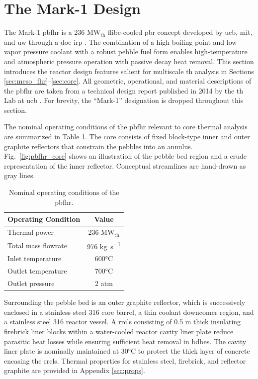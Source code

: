 \section{The Mark-1 Design}
\label{sec:mark1}

The Mark-1 \gls{pbfhr} is a 236 MW$_\text{th}$ \gls{flibe}-cooled \gls{pbr} concept developed by \gls{ucb}, \gls{mit}, and \gls{uw} through a \gls{doe} \gls{irp} \cite{pbfhr}. The combination of a high boiling point and low vapor pressure coolant with a robust pebble fuel form enables high-temperature and atmospheric pressure operation with passive decay heat removal. This section introduces the reactor design features salient for multiscale \gls{th} analysis in Sections \ref{sec:meso_fhr}--\ref{sec:core}. All geometric, operational, and material descriptions of the \gls{pbfhr} are taken from a technical design report published in 2014 by the \gls{th} Lab at \gls{ucb} \cite{pbfhr}. For brevity, the ``Mark-1'' designation is dropped throughout this section.

The nominal operating conditions of the \gls{pbfhr} relevant to core thermal analysis are summarized in Table \ref{table:operating}. The core consists of fixed block-type inner and outer graphite reflectors that constrain the pebbles into an annulus. Fig.\ \ref{fig:pbfhr_core} shows an illustration of the pebble bed region and a crude representation of the inner reflector. Conceptual streamlines are hand-drawn as gray lines. 

\begin{table}[htb!]
\caption{Nominal operating conditions of the \gls{pbfhr}.}
\centering
\small
\begin{tabular}{|l|c|}
\hline\hline
Operating Condition & Value\Tstrut\Bstrut\\
\hline
Thermal power & 236 \si{\mega\watt}$_\text{th}$\Tstrut\\
Total mass flowrate & 976 \si{\kilo\gram\per\second}\\
Inlet temperature & 600\si{\celsius}\\
Outlet temperature & 700\si{\celsius}\\
Outlet pressure & 2 atm\Bstrut\\
\hline
\end{tabular}
\label{table:operating}
\end{table}

Surrounding the pebble bed is an outer graphite reflector, which is successively enclosed in a stainless steel 316 core barrel, a thin coolant downcomer region, and a stainless steel 316 reactor vessel. A \gls{rrcls} consisting of 0.5 \si{\meter} thick insulating firebrick liner blocks within a water-cooled reactor cavity liner plate reduce parasitic heat losses while ensuring sufficient heat removal in \glspl{bdbe}. The cavity liner plate is nominally maintained at 30\si{\celsius} to protect the thick layer of concrete encasing the \gls{rrcls}. Thermal properties for stainless steel, firebrick, and reflector graphite are provided in Appendix \ref{sec:props}.

